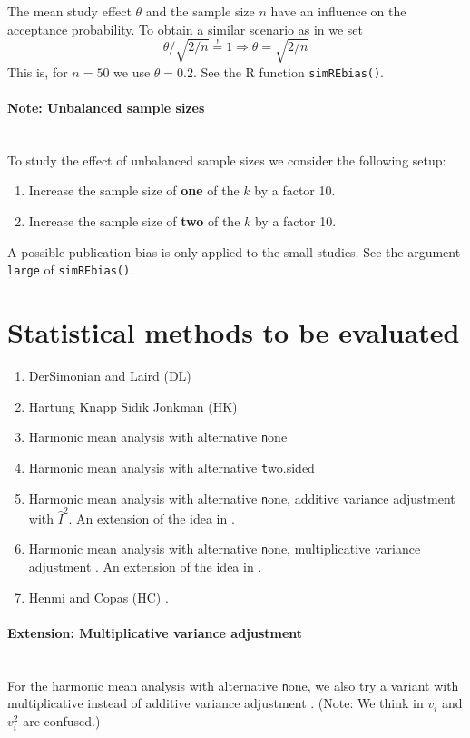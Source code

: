 \documentclass[letterpaper, 9pt]{article}
\begin{document}
The mean study effect $\theta$ and the sample size $n$ have an influence on the acceptance probability.
To obtain a similar scenario as in \cite{henm:copa:10} we set
$$ \theta / \sqrt{2/n}  \overset{!}{=} 1 \Rightarrow \theta = \sqrt{2/n}$$
This is, for $n=50$ we use $\theta = 0.2$. See the R function \texttt{simREbias()}.


\paragraph{Note: Unbalanced sample sizes}\mbox{}\\
To study the effect of unbalanced sample sizes we consider the following setup:
\begin{enumerate}
\item Increase the sample size of \textbf{one} of the $k$ by a factor 10. 
\item Increase the sample size of \textbf{two} of the $k$ by a factor 10. 
\end{enumerate}
A possible publication bias is only applied to the small studies.
See the argument \texttt{large} of \texttt{simREbias()}.



\section{Statistical methods to be evaluated} \label{sec:method}
\begin{enumerate}
\item DerSimonian and Laird (DL) \cite{ders:lair:86}
\item Hartung Knapp Sidik Jonkman (HK) \cite{IntHoutIoannidis}
\item Harmonic mean analysis with alternative {\texttt none} \cite{Held2020b}
\item Harmonic mean analysis with alternative {\texttt two.sided} \cite{Held2020b}
\item Harmonic mean analysis with alternative {\texttt none}, additive variance adjustment with $\hat I^2$. An extension of the idea in \cite{Held2020b}. 
\item Harmonic mean analysis with alternative {\texttt none}, multiplicative variance adjustment \cite{mawd:etal:17}. An extension of the idea in \cite{Held2020b}.
\item Henmi and Copas (HC) \cite{henm:copa:10}.
\end{enumerate}


\paragraph{Extension: Multiplicative variance adjustment}\mbox{}\\
For the harmonic mean analysis with alternative {\texttt none}, we also try a variant with multiplicative instead of additive variance adjustment \cite{mawd:etal:17}.
(Note: We think in \cite{mawd:etal:17} $v_i$ and $v_i^2$ are confused.)
\end{document}
